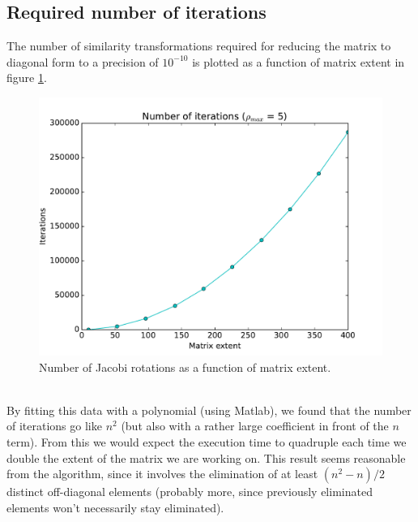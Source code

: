 \documentclass{article}
\begin{document}
\FloatBarrier
\subsection{Required number of iterations} \label{section:iters}
The number of similarity transformations required for reducing the matrix to diagonal form to a precision of $10^{-10}$ is plotted as a function of matrix extent in figure \ref{fig:iters}.\\
\begin{figure}[!h]
	\centering
	\includegraphics[width=\linewidth]{iterations.pdf}
	\caption{Number of Jacobi rotations as a function of matrix extent.}
	\label{fig:iters}
\end{figure}\\
By fitting this data with a polynomial (using Matlab), we found that the number of iterations go like $n^2$ (but also with a rather large coefficient in front of the $n$ term). From this we would expect the execution time to quadruple each time we double the extent of the matrix we are working on. This result seems reasonable from the algorithm, since it involves the elimination of at least $(n^2 - n)/2$ distinct off-diagonal elements (probably more, since previously eliminated elements won't necessarily stay eliminated).

\FloatBarrier
\end{document}
